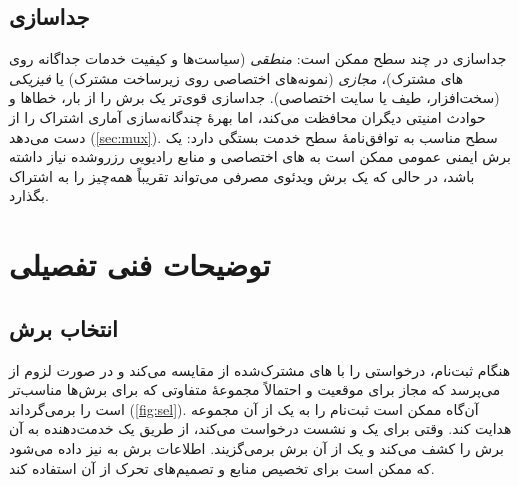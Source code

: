 \documentclass[11pt,a4paper]{article}
\begin{document}
\begin{acnfigure}
  \caption{سه برش سرتاسری که  و کارکردهای کنترلی مشترک را به اشتراک می‌گذارند، با ها و های ویژهٔ برش.}
  \label{fig:slices}
\end{acnfigure}

\subsection{جداسازی}
جداسازی در چند سطح ممکن است: \emph{منطقی} (سیاست‌ها و کیفیت خدمات جداگانه روی های مشترک)، \emph{مجازی} (نمونه‌های
 اختصاصی روی زیرساخت مشترک) یا \emph{فیزیکی} (سخت‌افزار، طیف یا سایت اختصاصی). جداسازی قوی‌تر یک برش را از بار، خطاها و
حوادث امنیتی دیگران محافظت می‌کند، اما بهرهٔ چندگانه‌سازی آماری اشتراک را از دست می‌دهد (\cref{sec:mux}). سطح مناسب به توافق‌نامهٔ
سطح خدمت بستگی دارد: یک برش ایمنی عمومی ممکن است به های اختصاصی و منابع رادیویی رزروشده نیاز داشته باشد، در حالی که یک
برش ویدئوی مصرفی می‌تواند تقریباً همه‌چیز را به اشتراک بگذارد.

\section{توضیحات فنی تفصیلی}

\subsection{انتخاب برش}
هنگام ثبت‌نام،   درخواستی را با های مشترک‌شده از  مقایسه می‌کند و در صورت لزوم از
 می‌پرسد که  مجاز برای موقعیت  و احتمالاً مجموعهٔ  متفاوتی که برای برش‌ها مناسب‌تر است را
برمی‌گرداند (\cref{fig:sel}). آن‌گاه  ممکن است ثبت‌نام را به یک  از آن مجموعه هدایت کند. وقتی  برای یک
 و  نشست  درخواست می‌کند،  از طریق  یک  خدمت‌دهنده به آن برش را کشف
می‌کند و  یک  از آن برش برمی‌گزیند. اطلاعات برش به  نیز داده می‌شود که ممکن است برای تخصیص منابع و
تصمیم‌های تحرک از آن استفاده کند.

\begin{acnfigure}
  \caption{انتخاب برش هنگام ثبت‌نام و برقراری نشست  ویژهٔ برش (ساده‌شده).}
  \label{fig:sel}
\end{acnfigure}
\end{document}

